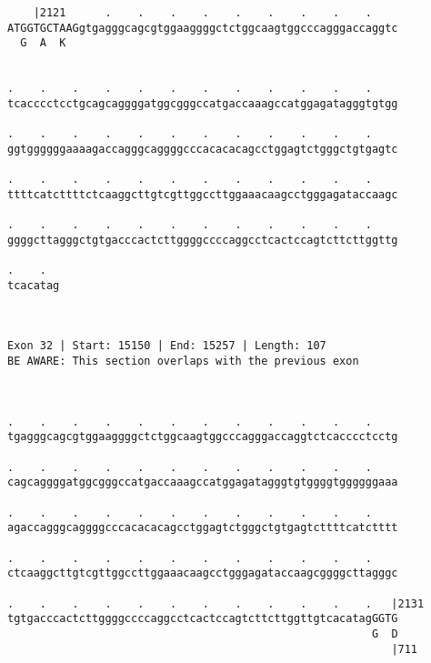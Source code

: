 \documentclass{article}
\begin{document}
\begin{Verbatim}
    |2121      .    .    .    .    .    .    .    .    .    
ATGGTGCTAAGgtgagggcagcgtggaaggggctctggcaagtggcccagggaccaggtc
  G  A  K                                                   
                                                            
  
.    .    .    .    .    .    .    .    .    .    .    .    
tcacccctcctgcagcaggggatggcgggccatgaccaaagccatggagatagggtgtgg
                                                            
.    .    .    .    .    .    .    .    .    .    .    .    
ggtggggggaaaagaccagggcaggggcccacacacagcctggagtctgggctgtgagtc
                                                            
.    .    .    .    .    .    .    .    .    .    .    .    
ttttcatcttttctcaaggcttgtcgttggccttggaaacaagcctgggagataccaagc
                                                            
.    .    .    .    .    .    .    .    .    .    .    .    
ggggcttagggctgtgacccactcttggggccccaggcctcactccagtcttcttggttg
                                                            
.    .  
tcacatag
        
        
 
Exon 32 | Start: 15150 | End: 15257 | Length: 107
BE AWARE: This section overlaps with the previous exon



.    .    .    .    .    .    .    .    .    .    .    .    
tgagggcagcgtggaaggggctctggcaagtggcccagggaccaggtctcacccctcctg
                                                            
.    .    .    .    .    .    .    .    .    .    .    .    
cagcaggggatggcgggccatgaccaaagccatggagatagggtgtggggtggggggaaa
                                                            
.    .    .    .    .    .    .    .    .    .    .    .    
agaccagggcaggggcccacacacagcctggagtctgggctgtgagtcttttcatctttt
                                                            
.    .    .    .    .    .    .    .    .    .    .    .    
ctcaaggcttgtcgttggccttggaaacaagcctgggagataccaagcggggcttagggc
                                                            
.    .    .    .    .    .    .    .    .    .    .    .   |2131
tgtgacccactcttggggccccaggcctcactccagtcttcttggttgtcacatagGGTG
                                                        G  D
                                                           |711
  

\end{Verbatim}
\end{document}
